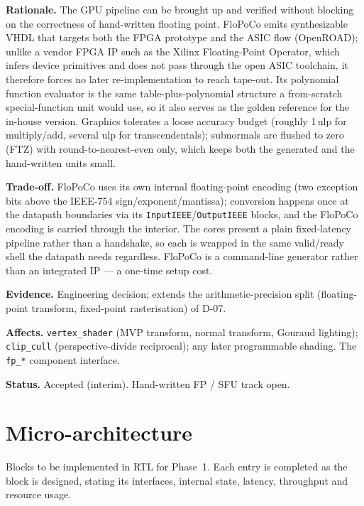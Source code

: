 \documentclass[11pt,a4paper]{article}
\newcommand{\field}[1]{\textbf{#1}\quad}
\begin{document}
\field{Rationale.} The GPU pipeline can be brought up and verified without
blocking on the correctness of hand-written floating point. FloPoCo emits
synthesizable VHDL that targets both the FPGA prototype and the ASIC flow
(OpenROAD); unlike a vendor FPGA IP such as the Xilinx Floating-Point Operator,
which infers device primitives and does not pass through the open ASIC
toolchain, it therefore forces no later re-implementation to reach tape-out. Its
polynomial function evaluator is the same table-plus-polynomial structure a
from-scratch special-function unit would use, so it also serves as the golden
reference for the in-house version. Graphics tolerates a loose accuracy budget
(roughly 1\,ulp for multiply/add, several ulp for transcendentals); subnormals
are flushed to zero (FTZ) with round-to-nearest-even only, which keeps both the
generated and the hand-written units small.

\field{Trade-off.} FloPoCo uses its own internal floating-point encoding (two
exception bits above the IEEE-754 sign/exponent/mantissa); conversion happens
once at the datapath boundaries via its \texttt{InputIEEE}/\texttt{OutputIEEE}
blocks, and the FloPoCo encoding is carried through the interior. The cores
present a plain fixed-latency pipeline rather than a handshake, so each is
wrapped in the same valid/ready shell the datapath needs regardless. FloPoCo is
a command-line generator rather than an integrated IP --- a one-time setup cost.

\field{Evidence.} Engineering decision; extends the arithmetic-precision split
(floating-point transform, fixed-point rasterisation) of D-07.

\field{Affects.} \texttt{vertex\_shader} (MVP transform, normal transform,
Gouraud lighting); \texttt{clip\_cull} (perspective-divide reciprocal); any
later programmable shading. The \texttt{fp\_*} component interface.

\field{Status.} Accepted (interim). Hand-written FP / SFU track open.

\section{Micro-architecture}
\label{sec:uarch}

Blocks to be implemented in RTL for Phase~1. Each entry is completed as the
block is designed, stating its interfaces, internal state, latency, throughput
and resource usage.
\end{document}
